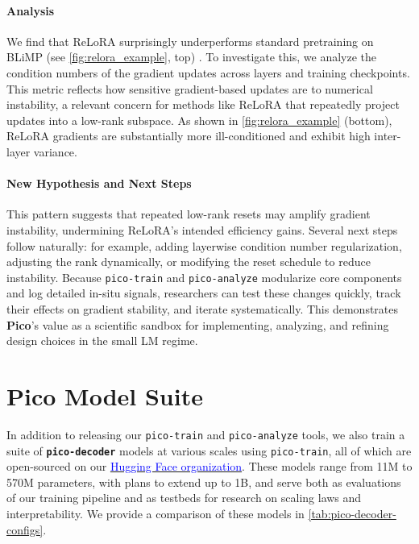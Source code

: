 \paragraph{Analysis} We find that ReLoRA surprisingly underperforms standard pretraining on BLiMP (see \cref{fig:relora_example}, top) \citep{warstadt2020blimp}. To investigate this, we analyze the condition numbers of the gradient updates across layers and training checkpoints. This metric reflects how sensitive gradient-based updates are to numerical instability, a relevant concern for methods like ReLoRA that repeatedly project updates into a low-rank subspace. As shown in \cref{fig:relora_example} (bottom), ReLoRA gradients are substantially more ill-conditioned and exhibit high inter-layer variance. 


\paragraph{New Hypothesis and Next Steps}
This pattern suggests that repeated low-rank resets may amplify gradient instability, undermining ReLoRA's intended efficiency gains. Several next steps follow naturally: for example, adding layerwise condition number regularization, adjusting the rank dynamically, or modifying the reset schedule to reduce instability. Because \texttt{pico-train} and \texttt{pico-analyze} modularize core components and log detailed in-situ signals, researchers can test these changes quickly, track their effects on gradient stability, and iterate systematically. This demonstrates \textbf{Pico}'s value as a scientific sandbox for implementing, analyzing, and refining design choices in the small LM regime.


\section{Pico Model Suite}

In addition to releasing our \texttt{pico-train} and \texttt{pico-analyze} tools, we also train a suite of \textbf{\texttt{pico-decoder}} models at various scales using \texttt{pico-train}, all of which are open-sourced on our \href{https://huggingface.co/pico-lm}{\textcolor{blue}{Hugging Face organization}}. These models range from 11M to 570M parameters, with plans to extend up to 1B, and serve both as evaluations of our training pipeline and as testbeds for research on scaling laws and interpretability. We provide a comparison of these models in \cref{tab:pico-decoder-configs}.

